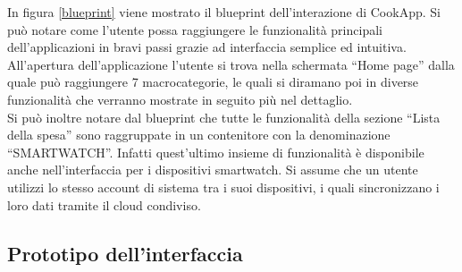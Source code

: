 In figura \ref{blueprint} viene mostrato il blueprint dell'interazione
di CookApp. Si può notare come l'utente possa raggiungere le
funzionalità principali dell'applicazioni in bravi passi grazie ad
interfaccia semplice ed intuitiva. All'apertura dell'applicazione
l'utente si trova nella schermata ``Home page'' dalla quale può raggiungere 7
macrocategorie, le quali si diramano poi in diverse funzionalità che verranno
mostrate in seguito più nel dettaglio.\\
Si può inoltre notare dal blueprint che tutte le funzionalità della
sezione ``Lista della spesa''  sono raggruppate in un contenitore con la
denominazione ``SMARTWATCH''. Infatti quest'ultimo insieme di
funzionalità è disponibile anche nell'interfaccia per i dispositivi
smartwatch. Si assume che un utente utilizzi lo stesso account di
sistema tra i suoi dispositivi, i quali sincronizzano i loro dati
tramite il cloud condiviso.


\begin{landscape}
\label{fig:blueprint}
\begin{figure}[ht]
\centering
{}
\end{figure}
\end{landscape}


\subsection{Prototipo dell'interfaccia}
